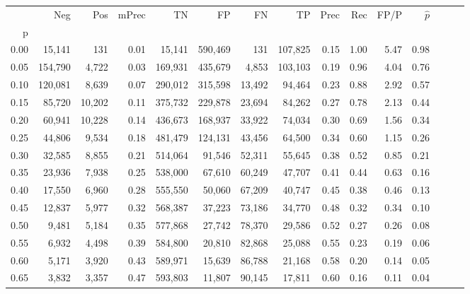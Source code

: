 \begin{tabular}{rrrrrrrrrrrrrrr}
\toprule
{} &      Neg &     Pos & mPrec &       TN &       FP &       FN &       TP &  Prec &   Rec &  FP/P & $\hat{p}$ \\
p    &          &         &       &          &          &          &          &       &       &       &           \\
\midrule
0.00 &   15,141 &     131 &  0.01 &   15,141 &  590,469 &      131 &  107,825 &  0.15 &  1.00 &  5.47 &      0.98 \\
0.05 &  154,790 &   4,722 &  0.03 &  169,931 &  435,679 &    4,853 &  103,103 &  0.19 &  0.96 &  4.04 &      0.76 \\
0.10 &  120,081 &   8,639 &  0.07 &  290,012 &  315,598 &   13,492 &   94,464 &  0.23 &  0.88 &  2.92 &      0.57 \\
0.15 &   85,720 &  10,202 &  0.11 &  375,732 &  229,878 &   23,694 &   84,262 &  0.27 &  0.78 &  2.13 &      0.44 \\
0.20 &   60,941 &  10,228 &  0.14 &  436,673 &  168,937 &   33,922 &   74,034 &  0.30 &  0.69 &  1.56 &      0.34 \\
0.25 &   44,806 &   9,534 &  0.18 &  481,479 &  124,131 &   43,456 &   64,500 &  0.34 &  0.60 &  1.15 &      0.26 \\
0.30 &   32,585 &   8,855 &  0.21 &  514,064 &   91,546 &   52,311 &   55,645 &  0.38 &  0.52 &  0.85 &      0.21 \\
0.35 &   23,936 &   7,938 &  0.25 &  538,000 &   67,610 &   60,249 &   47,707 &  0.41 &  0.44 &  0.63 &      0.16 \\
0.40 &   17,550 &   6,960 &  0.28 &  555,550 &   50,060 &   67,209 &   40,747 &  0.45 &  0.38 &  0.46 &      0.13 \\
0.45 &   12,837 &   5,977 &  0.32 &  568,387 &   37,223 &   73,186 &   34,770 &  0.48 &  0.32 &  0.34 &      0.10 \\
0.50 &    9,481 &   5,184 &  0.35 &  577,868 &   27,742 &   78,370 &   29,586 &  0.52 &  0.27 &  0.26 &      0.08 \\
0.55 &    6,932 &   4,498 &  0.39 &  584,800 &   20,810 &   82,868 &   25,088 &  0.55 &  0.23 &  0.19 &      0.06 \\
0.60 &    5,171 &   3,920 &  0.43 &  589,971 &   15,639 &   86,788 &   21,168 &  0.58 &  0.20 &  0.14 &      0.05 \\
0.65 &    3,832 &   3,357 &  0.47 &  593,803 &   11,807 &   90,145 &   17,811 &  0.60 &  0.16 &  0.11 &      0.04 \\

\end{tabular}
